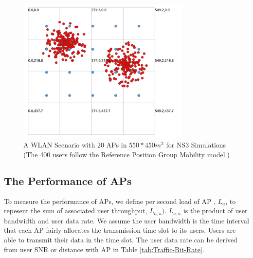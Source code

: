 \begin{figure}[tbp]
\begin{center}
\includegraphics[width=3.4in]{images/400n.png}
\end{center}
\caption{A WLAN Scenario with 20 APs in $550*450m^2$ for NS3 Simulations (The 400 users follow the Reference Position Group Mobility model.)}
\label{fig:scenario-400n}
\end{figure}

\subsection{The Performance of APs}
To measure the performance of APs, we define per second load of AP , $L_a$, to repesent the sum of associated user throughput, $L_{a,u})$. $L_{a,u}$ is the product of user bandwidth and user data rate. We assume the user bandwidth is the time interval that each AP fairly allocates the transmission time slot to its users. Users are able to transmit their data in the time slot. The user data rate can be derived from user SNR or distance with AP in Table \ref{tab:Traffic-Bit-Rate}.

